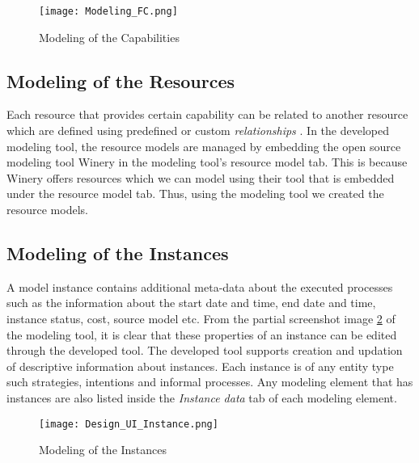 \begin{figure} [H]
	\centering
	\texttt{[image: Modeling\_FC.png]}
	\caption{Modeling of the Capabilities}
	\label{fig:modeling_fc}
\end{figure}

\subsection{Modeling of the Resources}
Each resource that provides certain capability can be related to another resource which are defined using predefined or custom \textit{relationships} \cite{Sungur2014a}. In the developed modeling tool, the resource models are managed by embedding the open source modeling tool Winery \cite{Kopp2013} in the modeling tool's resource model tab. This is because Winery offers resources which we can model using their tool that is embedded under the resource model tab. Thus, using the modeling tool we created the resource models. 

\subsection{Modeling of the Instances}
 A model instance contains additional meta-data about the executed processes such as the information about the start date and time, end date and time, instance status, cost, source model etc. From the partial screenshot image \ref{fig:realizationofinstances} of the modeling tool, it is clear that these properties of an instance can be edited through the developed tool. The developed tool supports creation and updation of descriptive information about instances. Each instance is of any entity type such strategies, intentions and informal processes. Any modeling element that has instances are also listed inside the \textit{Instance data} tab of each modeling element.  
 
\begin{figure} [H]
	\centering
	\texttt{[image: Design\_UI\_Instance.png]}
	\caption{Modeling of the Instances}
	\label{fig:realizationofinstances}
\end{figure}

